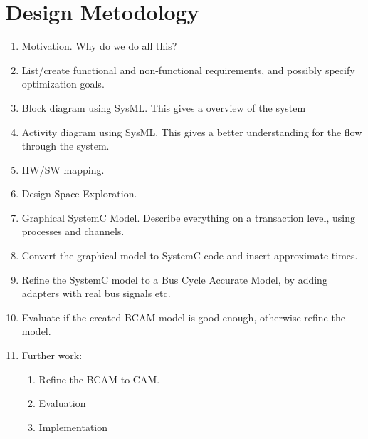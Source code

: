 \chapter{Design Metodology}

\begin{enumerate}
\item Motivation. Why do we do all this?
\item List/create functional and non-functional requirements, and possibly specify optimization goals.
\item Block diagram using SysML. This gives a overview of the system
\item Activity diagram using SysML. This gives a better understanding for the flow through the system.
\item HW/SW mapping.
\item Design Space Exploration.
\item Graphical SystemC Model. Describe everything on a transaction level, using processes and channels.
\item Convert the graphical model to SystemC code and insert approximate times.
\item Refine the SystemC model to a Bus Cycle Accurate Model, by adding adapters with real bus signals etc.
\item Evaluate if the created BCAM model is good enough, otherwise refine the model.
\item Further work:
\begin{enumerate}
\item Refine the BCAM to CAM.
\item Evaluation
\item Implementation
\end{enumerate}
\end{enumerate}

